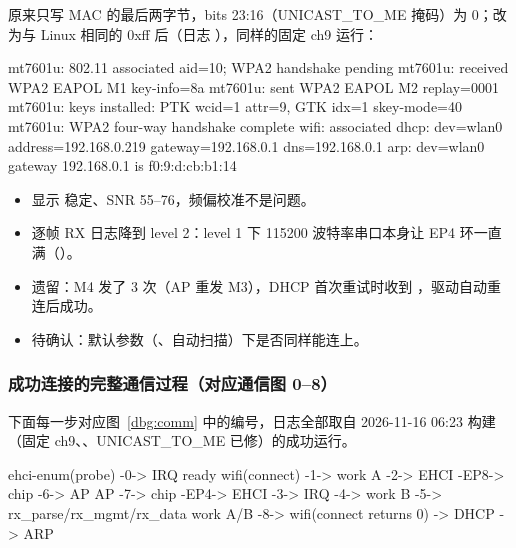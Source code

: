  原来只写 MAC 的最后两字节，bits 23:16（UNICAST\_TO\_ME 掩码）为 0；改为与 Linux
 相同的 0xff 后（日志 ），同样的固定 ch9 运行：

\begin{dbglog}
mt7601u: 802.11 associated aid=10; WPA2 handshake pending
mt7601u: received WPA2 EAPOL M1 key-info=8a
mt7601u: sent WPA2 EAPOL M2 replay=0001
mt7601u: keys installed: PTK wcid=1 attr=9, GTK idx=1 skey-mode=40
mt7601u: WPA2 four-way handshake complete
wifi: associated
dhcp: dev=wlan0 address=192.168.0.219 gateway=192.168.0.1 dns=192.168.0.1
arp: dev=wlan0 gateway 192.168.0.1 is f0:9:d:cb:b1:14
\end{dbglog}

\begin{itemize}[leftmargin=2em]
\item {} 显示  稳定、SNR 55--76，频偏校准不是问题。
\item 逐帧 RX 日志降到 level 2：level 1 下 115200 波特率串口本身让 EP4 环一直满（）。
\item 遗留：M4 发了 3 次（AP 重发 M3），DHCP 首次重试时收到 ，驱动自动重连后成功。
\item 待确认：默认参数（、自动扫描）下是否同样能连上。
\end{itemize}


\subsubsection{成功连接的完整通信过程（对应通信图 0--8）}\label{dbg:steps}

下面每一步对应图~\ref{dbg:comm} 中的编号，日志全部取自 2026-11-16 06:23 构建（固定 ch9、、UNICAST\_TO\_ME 已修）的成功运行。

\begin{dbgcode}
ehci-enum(probe) -0-> IRQ ready
wifi(connect) -1-> work A -2-> EHCI -EP8-> chip -6-> AP
AP -7-> chip -EP4-> EHCI -3-> IRQ -4-> work B -5-> rx_parse/rx_mgmt/rx_data
work A/B -8-> wifi(connect returns 0) -> DHCP -> ARP
\end{dbgcode}

